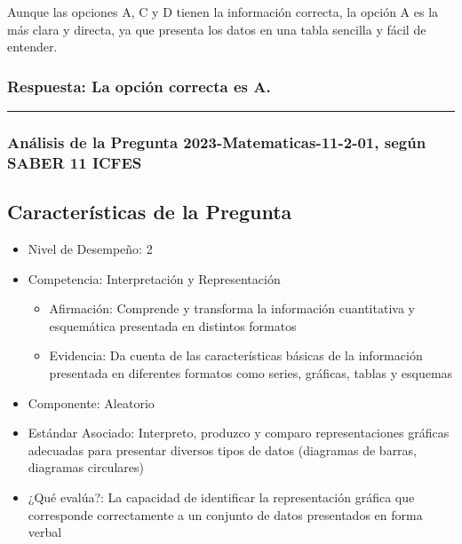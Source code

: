 \documentclass[
]{article}
\providecommand{\tightlist}{%
  \setlength{\itemsep}{0pt}\setlength{\parskip}{0pt}}
\begin{document}
Aunque las opciones A, C y D tienen la información correcta, la opción A
es la más clara y directa, ya que presenta los datos en una tabla
sencilla y fácil de entender.

\subsubsection{\texorpdfstring{\textbf{Respuesta:} La opción correcta es
\textbf{A}.}{Respuesta: La opción correcta es A.}}\label{respuesta-la-opciuxf3n-correcta-es-a.}

\begin{center}\rule{0.5\linewidth}{0.5pt}\end{center}

\subsubsection{Análisis de la Pregunta 2023-Matematicas-11-2-01, según
SABER 11
ICFES}\label{anuxe1lisis-de-la-pregunta-2023-matematicas-11-2-01-seguxfan-saber-11-icfes}

\subsection{Características de la
Pregunta}\label{caracteruxedsticas-de-la-pregunta}

\begin{itemize}
\tightlist
\item
  Nivel de Desempeño: 2
\item
  Competencia: Interpretación y Representación

  \begin{itemize}
  \tightlist
  \item
    Afirmación: Comprende y transforma la información cuantitativa y
    esquemática presentada en distintos formatos
  \item
    Evidencia: Da cuenta de las características básicas de la
    información presentada en diferentes formatos como series, gráficas,
    tablas y esquemas
  \end{itemize}
\item
  Componente: Aleatorio
\item
  Estándar Asociado: Interpreto, produzco y comparo representaciones
  gráficas adecuadas para presentar diversos tipos de datos (diagramas
  de barras, diagramas circulares)
\item
  ¿Qué evalúa?: La capacidad de identificar la representación gráfica
  que corresponde correctamente a un conjunto de datos presentados en
  forma verbal
\end{itemize}
\end{document}
